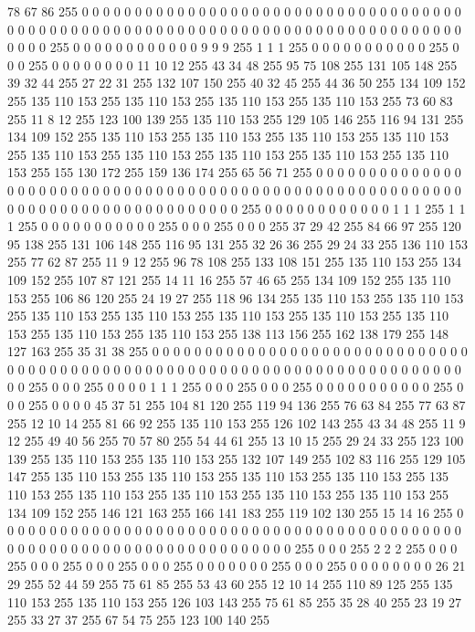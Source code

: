 78 67 86 255 0 0 0 0 0 0 0 0 0 0 0 0 0 0 0 0 0 0 0 0 0 0 0 0 0 0 0 0 0 0 0 0 0 0 0 0 0 0 0 0 0 0 0 0 0 0 0 0 0 0 0 0 0 0 0 0 0 0 0 0
0 0 0 0 0 0 0 0 0 0 0 0 0 0 0 0 0 0 0 0 0 0 0 255 0 0 0 0 0 0 0 0 0 0 0 0 9 9 9 255 1 1 1 255 0 0 0 0 0 0 0 0 0 0 0 255 0 0 0 255 0 0 0 0
0 0 0 0 11 10 12 255 43 34 48 255 95 75 108 255 131 105 148 255 39 32 44 255 27 22 31 255 132 107 150 255 40 32 45 255 44 36 50 255 134 109 152 255 135 110 153 255 135 110 153 255 135 110 153 255 135 110 153 255 73 60 83 255
11 8 12 255 123 100 139 255 135 110 153 255 129 105 146 255 116 94 131 255 134 109 152 255 135 110 153 255 135 110 153 255 135 110 153 255 135 110 153 255 135 110 153 255 135 110 153 255 135 110 153 255 135 110 153 255 135 110 153 255 155 130 172 255
159 136 174 255 65 56 71 255 0 0 0 0 0 0 0 0 0 0 0 0 0 0 0 0 0 0 0 0 0 0 0 0 0 0 0 0 0 0 0 0 0 0 0 0 0 0 0 0 0 0 0 0 0 0 0 0 0 0 0 0 0 0 0 0
0 0 0 0 0 0 0 0 0 0 0 0 0 0 0 0 0 0 0 0 0 0 0 255 0 0 0 0 0 0 0 0 0 0 0 0 1 1 1 255 1 1 1 255 0 0 0 0 0 0 0 0 0 0 0 255 0 0 0 255 0 0 0 255
37 29 42 255 84 66 97 255 120 95 138 255 131 106 148 255 116 95 131 255 32 26 36 255 29 24 33 255 136 110 153 255 77 62 87 255 11 9 12 255 96 78 108 255 133 108 151 255 135 110 153 255 134 109 152 255 107 87 121 255 14 11 16 255
57 46 65 255 134 109 152 255 135 110 153 255 106 86 120 255 24 19 27 255 118 96 134 255 135 110 153 255 135 110 153 255 135 110 153 255 135 110 153 255 135 110 153 255 135 110 153 255 135 110 153 255 135 110 153 255 135 110 153 255 138 113 156 255
162 138 179 255 148 127 163 255 35 31 38 255 0 0 0 0 0 0 0 0 0 0 0 0 0 0 0 0 0 0 0 0 0 0 0 0 0 0 0 0 0 0 0 0 0 0 0 0 0 0 0 0 0 0 0 0 0 0 0 0 0 0 0 0
0 0 0 0 0 0 0 0 0 0 0 0 0 0 0 0 0 0 0 0 0 0 0 255 0 0 0 255 0 0 0 0 1 1 1 255 0 0 0 255 0 0 0 255 0 0 0 0 0 0 0 0 0 0 0 255 0 0 0 255 0 0 0 0
45 37 51 255 104 81 120 255 119 94 136 255 76 63 84 255 77 63 87 255 12 10 14 255 81 66 92 255 135 110 153 255 126 102 143 255 43 34 48 255 11 9 12 255 49 40 56 255 70 57 80 255 54 44 61 255 13 10 15 255 29 24 33 255
123 100 139 255 135 110 153 255 135 110 153 255 132 107 149 255 102 83 116 255 129 105 147 255 135 110 153 255 135 110 153 255 135 110 153 255 135 110 153 255 135 110 153 255 135 110 153 255 135 110 153 255 135 110 153 255 135 110 153 255 134 109 152 255
146 121 163 255 166 141 183 255 119 102 130 255 15 14 16 255 0 0 0 0 0 0 0 0 0 0 0 0 0 0 0 0 0 0 0 0 0 0 0 0 0 0 0 0 0 0 0 0 0 0 0 0 0 0 0 0 0 0 0 0 0 0 0 0
0 0 0 0 0 0 0 0 0 0 0 0 0 0 0 0 0 0 0 0 0 0 0 255 0 0 0 255 2 2 2 255 0 0 0 255 0 0 0 255 0 0 0 255 0 0 0 255 0 0 0 0 0 0 0 255 0 0 0 255 0 0 0 0
0 0 0 0 26 21 29 255 52 44 59 255 75 61 85 255 53 43 60 255 12 10 14 255 110 89 125 255 135 110 153 255 135 110 153 255 126 103 143 255 75 61 85 255 35 28 40 255 23 19 27 255 33 27 37 255 67 54 75 255 123 100 140 255
